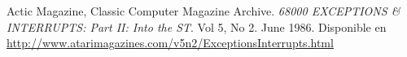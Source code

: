 
\begin{thebibliography}{9}

 Actic Magazine, Classic Computer Magazine Archive. \emph{68000 EXCEPTIONS \& INTERRUPTS: Part II: Into the ST}. Vol 5, No 2. June 1986. Disponible en \url{http://www.atarimagazines.com/v5n2/ExceptionsInterrupts.html}

\end{thebibliography}
